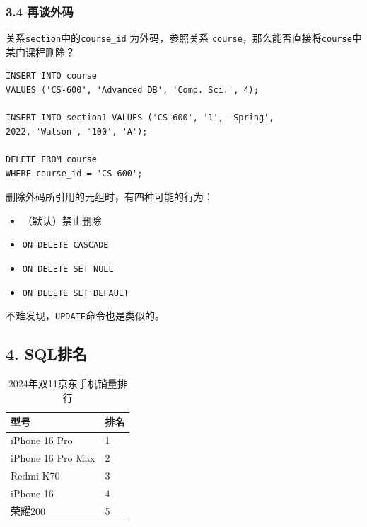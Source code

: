 \documentclass[aspectratio=169, 14pt]{beamer}
\begin{document}
\begin{frame}[fragile]
	\frametitle{3.4 再谈外码}
	关系\texttt{section}中的\texttt{course\_id} 为外码，参照关系 \texttt{course}，那么能否直接将\texttt{course}中某门课程删除？

	\begin{verbatim}
INSERT INTO course
VALUES ('CS-600', 'Advanced DB', 'Comp. Sci.', 4);

INSERT INTO section1 VALUES ('CS-600', '1', 'Spring', 
2022, 'Watson', '100', 'A');

DELETE FROM course
WHERE course_id = 'CS-600';
\end{verbatim}

\end{frame}

\begin{frame}
	删除外码所引用的元组时，有四种可能的行为：
	\begin{itemize}
		\item（默认）禁止删除
		\item \texttt{ON DELETE CASCADE}
		\item \texttt{ON DELETE SET NULL}
		\item \texttt{ON DELETE SET DEFAULT}
	\end{itemize}

	不难发现，\texttt{UPDATE}命令也是类似的。

\end{frame}

\begin{frame}
	\section{\textcolor{darkmidnightblue}{4. SQL排名}}

	\begin{table}
		\caption*{2024年双11京东手机销量排行}
		\begin{tabular}{ll}
			\toprule
			型号                & 排名 \\
			\midrule
			iPhone 16 Pro     & 1  \\
			iPhone 16 Pro Max & 2  \\
			Redmi K70         & 3  \\
			iPhone 16         & 4  \\
			荣耀200             & 5  \\
			\bottomrule
		\end{tabular}
	\end{table}
\end{frame}
\end{document}
